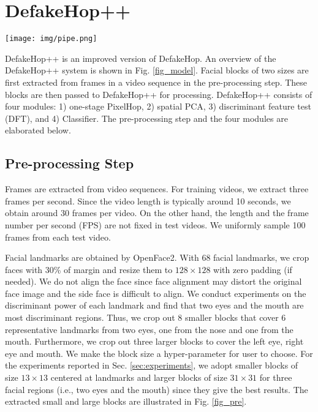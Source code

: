 \documentclass[main, biber]{now-journal}
\begin{document}
\section{DefakeHop++}\label{sec:method}

\begin{figure*}[!t]
\centering
\texttt{[image: img/pipe.png]}
\caption{An overview of DefakeHop++.}\label{fig_model}
\end{figure*}

DefakeHop++ is an improved version of DefakeHop. An overview of the
DefakeHop++ system is shown in Fig. \ref{fig_model}.  Facial blocks of
two sizes are first extracted from frames in a video sequence in the
pre-processing step. These blocks are then passed to DefakeHop++ for
processing. DefakeHop++ consists of four modules: 1) one-stage PixelHop,
2) spatial PCA, 3) discriminant feature test (DFT), and 4) Classifier.
The pre-processing step and the four modules are elaborated below. 

\subsection{Pre-processing Step}\label{subsec:preprocessing}

Frames are extracted from video sequences. For training videos, we
extract three frames per second. Since the video length is typically
around 10 seconds, we obtain around 30 frames per video. On the other
hand, the length and the frame number per second (FPS) are not fixed in
test videos. We uniformly sample 100 frames from each test video. 

Facial landmarks are obtained by OpenFace2. With 68 facial landmarks, we
crop faces with 30\% of margin and resize them to $128 \times 128$ with
zero padding (if needed).  We do not align the face since face alignment
may distort the original face image and the side face is difficult to
align.  We conduct experiments on the discriminant power of each
landmark and find that two eyes and the mouth are most discriminant
regions.  Thus, we crop out 8 smaller blocks that cover 6 representative
landmarks from two eyes, one from the nose and one from the mouth.
Furthermore, we crop out three larger blocks to cover the left eye,
right eye and mouth.  We make the block size a hyper-parameter for user
to choose.  For the experiments reported in Sec. \ref{sec:experiments},
we adopt smaller blocks of size $13 \times 13$ centered at landmarks and
larger blocks of size $31 \times 31$ for three facial regions (i.e., two
eyes and the mouth) since they give the best results.  The extracted
small and large blocks are illustrated in Fig. \ref{fig_pre}. 
\end{document}

